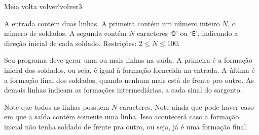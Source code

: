\documentclass[12pt,a4paper,oneside]{article}
\begin{document}
\begin{problem}{Meia volta volver!}{volver}{3}
%

\InputFile

A entrada contém duas linhas. A primeira contém um número inteiro $N$, o número de soldados. A segunda contém $N$ caracteres `\texttt{D}' ou `\texttt{E}', indicando a direção inicial de cada soldado. Restrições: $2 \leq N \leq 100$.


\OutputFile

Seu programa deve gerar uma ou mais linhas na saída. A primeira é a formação inicial dos soldados, ou seja, é igual à formação fornecida na entrada. A última é a formação final dos soldados, quando nenhum mais está de frente pro outro. As demais linhas indicam as formações intermediárias, a cada sinal do sargento.

Note que todos as linhas possuem $N$ caracteres. Note ainda que pode haver caso em que a saída contém somente uma linha. Isso acontecerá caso a formação inicial não tenha soldado de frente pra outro, ou seja, já é uma formação final.



\Example

\begin{example}
%
\end{example}

\begin{example}
%
\end{example}

\begin{example}
%
\end{example}

\begin{example}
%
\end{example}


\begin{example}
%
\end{example}


\end{problem}
\end{document}
